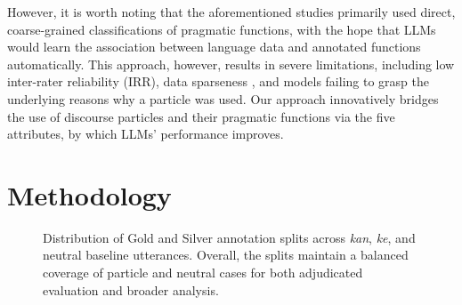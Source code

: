 \documentclass[11pt]{article}
\begin{document}
However, it is worth noting that the aforementioned studies primarily used direct, coarse-grained classifications of pragmatic functions, with the hope that LLMs would learn the association between language data and annotated functions automatically. This approach, however, results in severe limitations, including low inter-rater reliability (IRR), data sparseness \citep{defelice2013classification}, and models failing to grasp the underlying reasons why a particle was used. Our approach innovatively bridges the use of discourse particles and their pragmatic functions via the five attributes, by which LLMs' performance improves.


\section{Methodology}

\begin{figure}[t]
\centering
\small
{}

\caption{
Distribution of Gold and Silver annotation splits across \textit{kan}, \textit{ke}, and neutral baseline utterances.
Overall, the splits maintain a balanced coverage of particle and neutral cases for both adjudicated evaluation and broader analysis.
}
\label{fig:dataset-distribution}
\end{figure}
\end{document}
